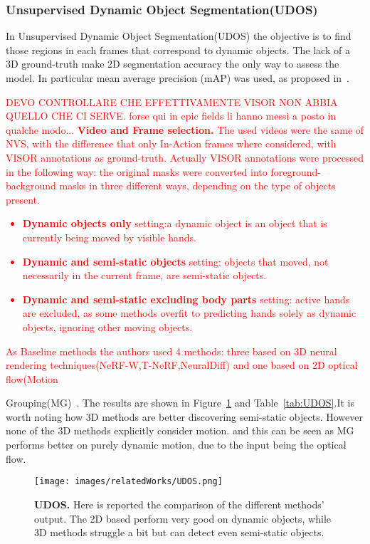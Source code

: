 \subsubsection{Unsupervised Dynamic Object Segmentation(UDOS)}
In Unsupervised Dynamic Object Segmentation(UDOS) the objective is to find those regions in each frames that correspond to dynamic objects. The lack
of a 3D ground-truth make 2D segmentation accuracy the only way to assess the model. In particular mean average precision (mAP) was used, as proposed in~\cite{neuraldiff}.

\textcolor{red}{DEVO CONTROLLARE CHE EFFETTIVAMENTE VISOR NON ABBIA QUELLO CHE CI SERVE. forse qui in epic fields li hanno messi a posto in qualche modo...    
\textbf{Video and Frame selection.} The used videos were the same of NVS, with the difference that only In-Action frames where considered,
 with VISOR annotations as ground-truth. Actually VISOR annotations were processed in the following way: the original masks were converted into 
 foreground-background masks in three different ways, depending on the type of objects present.
 \begin{itemize}
    \item \textbf{Dynamic objects only} setting:a dynamic object is an object that is currently being moved by visible hands.
    \item \textbf{Dynamic and semi-static objects} setting: objects that moved, not necessarily in the current frame, are semi-static objects.
    \item \textbf{Dynamic and semi-static excluding body parts} setting: active hands are excluded, as some methods overfit to predicting hands solely
    as dynamic objects, ignoring other moving objects.
 \end{itemize}
 As Baseline methods the authors used 4 methods: three based on 3D neural rendering techniques(NeRF-W,T-NeRF,NeuralDiff) and one based on 2D optical flow(Motion
 }
 Grouping(MG)~\cite{MG}. The results are shown in Figure~\ref{fig:UDOS} and Table~\ref{tab:UDOS}.It is worth noting how 3D methods are better discovering semi-static objects.
 However none of the 3D methods explicitly consider motion. and this can be seen as MG performs better on purely dynamic motion, due to the input being the optical flow.
\begin{figure}
    \centering
    \texttt{[image: images/relatedWorks/UDOS.png]} 
    \caption{\textbf{UDOS.} Here is reported the comparison of the different methods' output.
    The 2D based perform very good on dynamic objects, while 3D methods struggle a bit but can detect even semi-static objects.}\label{fig:UDOS}
\end{figure}
